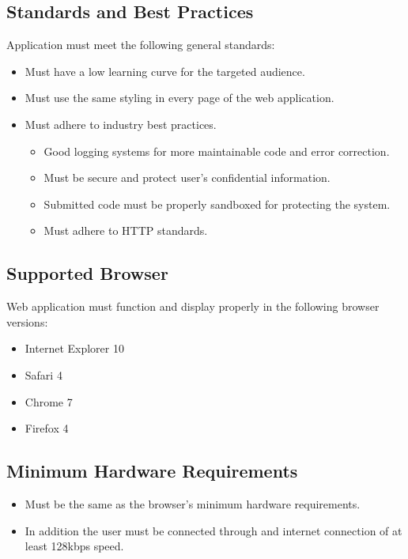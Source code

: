 \label{sec:stand}
\subsection{Standards and Best Practices}

Application must meet the following general standards:

\begin{itemize}
\item Must have a low learning curve for the targeted audience.
\item Must use the same styling in every page of the web application.
\item Must adhere to industry best practices.
\begin{itemize}
\item Good logging systems for more maintainable code and error correction.
\item Must be secure and protect user's confidential information.
\item Submitted code must be properly sandboxed for protecting the system.
\item Must adhere to HTTP standards.
\end{itemize}
\end{itemize}

\subsection{Supported Browser}

Web application must function and display properly in the following browser
versions:
\begin{itemize}
\item Internet Explorer 10
\item Safari 4
\item Chrome 7
\item Firefox 4
\end{itemize}

\subsection{Minimum Hardware Requirements}
\begin{itemize}
\item Must be the same as the browser's minimum hardware requirements.
\item In addition the user must be connected through and internet connection of
at least 128kbps speed.
\end{itemize}\newpage
